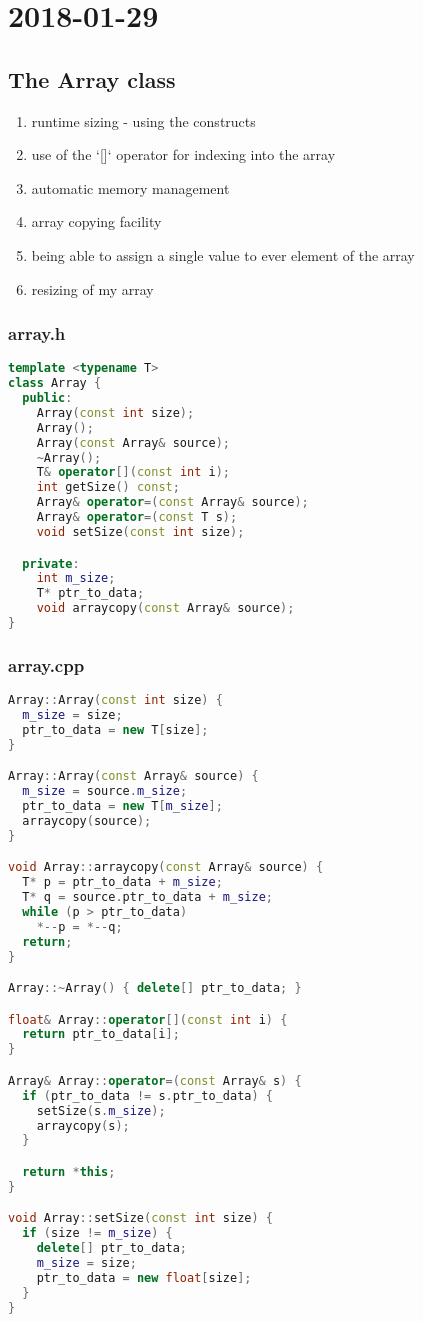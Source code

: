 \section{2018-01-29}

\subsection{The Array class}

\begin{enumerate}
  \item runtime sizing - using the constructs
  \item use of the `[]` operator for indexing into the array
  \item automatic memory management
  \item array copying facility
  \item being able to assign a single value to ever element of the array
  \item resizing of my array
\end{enumerate}

\subsubsection{array.h}

\begin{lstlisting}[language=C++]
template <typename T>
class Array {
  public:
    Array(const int size);
    Array();
    Array(const Array& source);
    ~Array();
    T& operator[](const int i);
    int getSize() const;
    Array& operator=(const Array& source);
    Array& operator=(const T s);
    void setSize(const int size);

  private:
    int m_size;
    T* ptr_to_data;
    void arraycopy(const Array& source);
}
\end{lstlisting}

\subsubsection{array.cpp}

\begin{lstlisting}[language=C++]
Array::Array(const int size) {
  m_size = size;
  ptr_to_data = new T[size];
}

Array::Array(const Array& source) {
  m_size = source.m_size;
  ptr_to_data = new T[m_size];
  arraycopy(source);
}

void Array::arraycopy(const Array& source) {
  T* p = ptr_to_data + m_size;
  T* q = source.ptr_to_data + m_size;
  while (p > ptr_to_data)
    *--p = *--q;
  return;
}

Array::~Array() { delete[] ptr_to_data; }

float& Array::operator[](const int i) {
  return ptr_to_data[i];
}

Array& Array::operator=(const Array& s) {
  if (ptr_to_data != s.ptr_to_data) {
    setSize(s.m_size);
    arraycopy(s);
  }

  return *this;
}

void Array::setSize(const int size) {
  if (size != m_size) {
    delete[] ptr_to_data;
    m_size = size;
    ptr_to_data = new float[size];
  }
}
\end{lstlisting}